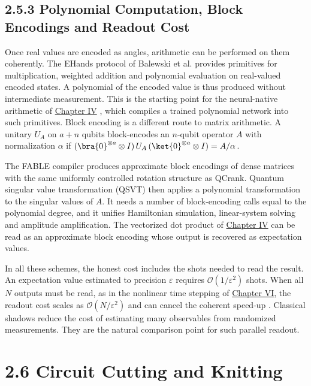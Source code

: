 \documentclass{report}
\theoremstyle{plain}
\theoremstyle{definition}
\theoremstyle{remark}
\newcommand{\bigO}[1]{\mathcal{O}\!\left(#1\right)}
\newcommand{\eps}{\varepsilon}
\begin{document}
\subsection{2.5.3 Polynomial Computation, Block Encodings and Readout Cost}

Once real values are encoded as angles, arithmetic can be performed on them coherently. The EHands protocol of Balewski et al. \cite{balewski2025ehands} provides primitives for multiplication, weighted addition and polynomial evaluation on real-valued encoded states. A polynomial of the encoded value is thus produced without intermediate measurement. This is the starting point for the neural-native arithmetic of \hyperref[ch:qml]{Chapter IV} \cite{guo2026nnqa}, which compiles a trained polynomial network into such primitives. Block encoding is a different route to matrix arithmetic. A unitary $U_A$ on $a+n$ qubits block-encodes an $n$-qubit operator $A$ with normalization $\alpha$ if $(\bra{0}^{\otimes a}\otimes I)\,U_A\,(\ket{0}^{\otimes a}\otimes I)=A/\alpha$.

The FABLE compiler \cite{camps2022fable} produces approximate block encodings of dense matrices with the same uniformly controlled rotation structure as QCrank. Quantum singular value transformation (QSVT) \cite{gilyen2019qsvt} then applies a polynomial transformation to the singular values of $A$. It needs a number of block-encoding calls equal to the polynomial degree, and it unifies Hamiltonian simulation, linear-system solving and amplitude amplification. The vectorized dot product of \hyperref[ch:qml]{Chapter IV} \cite{guo2025vqt} can be read as an approximate block encoding whose output is recovered as expectation values.

In all these schemes, the honest cost includes the shots needed to read the result. An expectation value estimated to precision $\eps$ requires $\bigO{1/\eps^2}$ shots. When all $N$ outputs must be read, as in the nonlinear time stepping of \hyperref[ch:synthesis]{Chapter VI}, the readout cost scales as $\bigO{N/\eps^2}$ and can cancel the coherent speed-up \cite{guo2026nonlinearwaves}. Classical shadows \cite{huang2020shadows} reduce the cost of estimating many observables from randomized measurements. They are the natural comparison point for such parallel readout.

\section{2.6 Circuit Cutting and Knitting}\label{sec:bg:cutting}
\end{document}
